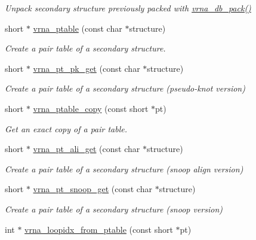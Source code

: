 \begin{DoxyCompactItemize}
\begin{DoxyCompactList}\small\item\em Unpack secondary structure previously packed with \hyperlink{group__struct__utils_ga55c4783060a1464f862f858d5599c9e1}{vrna\-\_\-db\-\_\-pack()} \end{DoxyCompactList}\item 
short $\ast$ \hyperlink{group__struct__utils_gae829fb8bb7f694c12a9c0bbc34c77c60}{vrna\-\_\-ptable} (const char $\ast$structure)
\begin{DoxyCompactList}\small\item\em Create a pair table of a secondary structure. \end{DoxyCompactList}\item 
short $\ast$ \hyperlink{group__struct__utils_gacca520048b24ec5a8978f4dafb4e4bf8}{vrna\-\_\-pt\-\_\-pk\-\_\-get} (const char $\ast$structure)
\begin{DoxyCompactList}\small\item\em Create a pair table of a secondary structure (pseudo-\/knot version) \end{DoxyCompactList}\item 
short $\ast$ \hyperlink{group__struct__utils_ga2daefbbd6d9f8803731651882f54332d}{vrna\-\_\-ptable\-\_\-copy} (const short $\ast$pt)
\begin{DoxyCompactList}\small\item\em Get an exact copy of a pair table. \end{DoxyCompactList}\item 
\hypertarget{group__struct__utils_ga1ee4cdcda1f57d32dcb38032116d335d}{short $\ast$ \hyperlink{group__struct__utils_ga1ee4cdcda1f57d32dcb38032116d335d}{vrna\-\_\-pt\-\_\-ali\-\_\-get} (const char $\ast$structure)}\label{group__struct__utils_ga1ee4cdcda1f57d32dcb38032116d335d}

\begin{DoxyCompactList}\small\item\em Create a pair table of a secondary structure (snoop align version) \end{DoxyCompactList}\item 
short $\ast$ \hyperlink{group__struct__utils_gaef0f7e1a6c00c81a349973de53039dda}{vrna\-\_\-pt\-\_\-snoop\-\_\-get} (const char $\ast$structure)
\begin{DoxyCompactList}\small\item\em Create a pair table of a secondary structure (snoop version) \end{DoxyCompactList}\item 
\hypertarget{group__struct__utils_ga03e15af299be0866ff21da880c74b92e}{int $\ast$ \hyperlink{group__struct__utils_ga03e15af299be0866ff21da880c74b92e}{vrna\-\_\-loopidx\-\_\-from\-\_\-ptable} (const short $\ast$pt)}\label{group__struct__utils_ga03e15af299be0866ff21da880c74b92e}


\end{DoxyCompactItemize}
